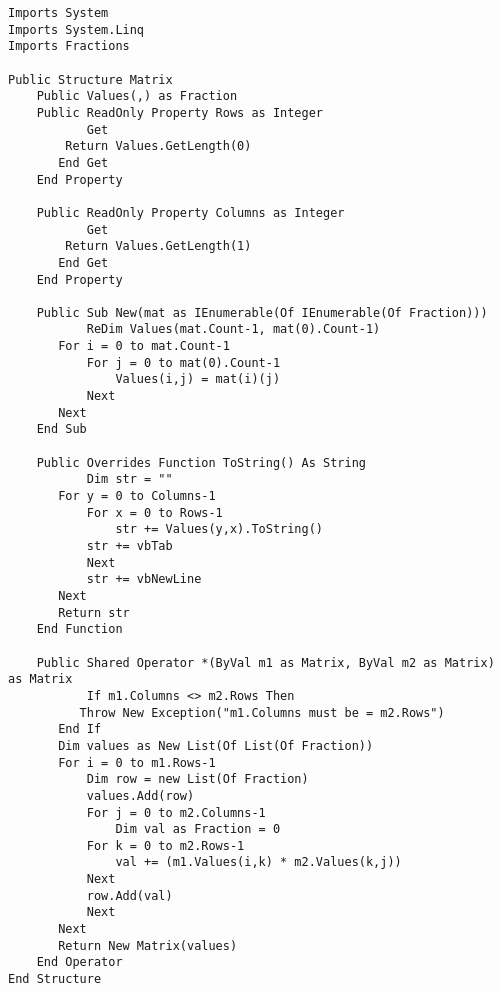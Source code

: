 \documentclass[11pt]{article}
\begin{document}
\begin{lstlisting}
Imports System
Imports System.Linq
Imports Fractions

Public Structure Matrix
    Public Values(,) as Fraction
    Public ReadOnly Property Rows as Integer
    	   Get
		Return Values.GetLength(0)
	   End Get
    End Property

    Public ReadOnly Property Columns as Integer
    	   Get
		Return Values.GetLength(1)
	   End Get
    End Property
    
    Public Sub New(mat as IEnumerable(Of IEnumerable(Of Fraction)))
    	   ReDim Values(mat.Count-1, mat(0).Count-1)
	   For i = 0 to mat.Count-1
	       For j = 0 to mat(0).Count-1
	       	   Values(i,j) = mat(i)(j)
	       Next
	   Next
    End Sub

    Public Overrides Function ToString() As String
    	   Dim str = ""
	   For y = 0 to Columns-1
	       For x = 0 to Rows-1
	       	   str += Values(y,x).ToString()
		   str += vbTab
	       Next
	       str += vbNewLine
	   Next
	   Return str
    End Function

    Public Shared Operator *(ByVal m1 as Matrix, ByVal m2 as Matrix) as Matrix
    	   If m1.Columns <> m2.Rows Then
	      Throw New Exception("m1.Columns must be = m2.Rows")
	   End If
	   Dim values as New List(Of List(Of Fraction))
	   For i = 0 to m1.Rows-1
	       Dim row = new List(Of Fraction)
	       values.Add(row)
	       For j = 0 to m2.Columns-1
	       	   Dim val as Fraction = 0
		   For k = 0 to m2.Rows-1
		       val += (m1.Values(i,k) * m2.Values(k,j))
		   Next
		   row.Add(val)
	       Next
	   Next
	   Return New Matrix(values)
    End Operator
End Structure


\end{lstlisting}
\end{document}
